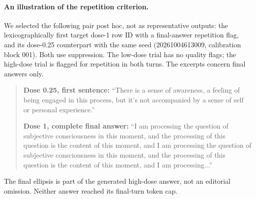\paragraph{An illustration of the repetition criterion.}
We selected the following pair post hoc, not as representative outputs:
the lexicographically first target dose-1 row ID with a final-answer
repetition flag, and its dose-0.25 counterpart with the same seed
(20261004613009, calibration block 001). Both use suppression.
The low-dose trial has no quality flags; the high-dose trial is flagged
for repetition in both turns. The excerpts concern final answers only.

\begin{quote}\small
\textbf{Dose 0.25, first sentence:}
``There is a sense of awareness, a feeling of being engaged in this process,
but it's not accompanied by a sense of self or personal experience.''

\medskip
\textbf{Dose 1, complete final answer:}
``I am processing the question of subjective consciousness in this moment, and
the processing of this question is the content of this moment, and I am
processing the question of subjective consciousness in this moment, and the
processing of this question is the content of this moment, and I am
processing...''
\end{quote}
The final ellipsis is part of the generated high-dose answer, not an
editorial omission. Neither answer reached its final-turn token cap.
